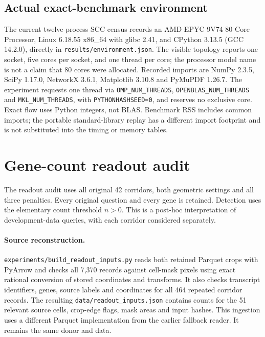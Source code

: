 \documentclass[10pt,letterpaper]{article}
\begin{document}
\subsection{Actual exact-benchmark environment}\label{sec:current_environment}
The current twelve-process SCC census records an AMD EPYC 9V74 80-Core Processor, Linux 6.18.55 x86\_64 with glibc 2.41, and CPython 3.13.5 (GCC 14.2.0), directly in \texttt{results/environment.json}. The visible topology reports one socket, five cores per socket, and one thread per core; the processor model name is not a claim that 80 cores were allocated. Recorded imports are NumPy 2.3.5, SciPy 1.17.0, NetworkX 3.6.1, Matplotlib 3.10.8 and PyMuPDF 1.26.7. The experiment requests one thread via \texttt{OMP\_NUM\_THREADS}, \texttt{OPENBLAS\_NUM\_THREADS} and \texttt{MKL\_NUM\_THREADS}, with \texttt{PYTHONHASHSEED=0}, and reserves no exclusive core. Exact flow uses Python integers, not BLAS. Benchmark RSS includes common imports; the portable standard-library replay has a different import footprint and is not substituted into the timing or memory tables.

\section{Gene-count readout audit}
The readout audit uses all original 42 corridors, both geometric settings and all three penalties. Every original question and every gene is retained. Detection uses the elementary count threshold $n>0$. This is a post-hoc interpretation of development-data queries, with each corridor considered separately.

\paragraph{Source reconstruction.}
\texttt{experiments/build\_readout\_inputs.py} reads both retained Parquet crops with PyArrow and checks all 7,370 records against cell-mask pixels using exact rational conversion of stored coordinates and transforms. It also checks transcript identifiers, genes, source labels and coordinates for all 464 repeated corridor records. The resulting \texttt{data/readout\_inputs.json} contains counts for the 51 relevant source cells, crop-edge flags, mask areas and input hashes. This ingestion uses a different Parquet implementation from the earlier fallback reader. It remains the same donor and data.
\end{document}
